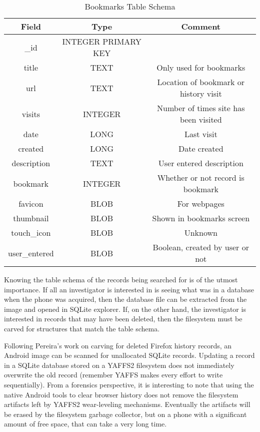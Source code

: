 \begin{table}
\begin {center}
	\begin{tabular}{| c | c | c |}
	\hline
	Field & Type & Comment \\
	\hline
	\_id & INTEGER PRIMARY KEY & \\
	title & TEXT  &  Only used for bookmarks \\
	url & TEXT  & Location of bookmark or history visit \\
	visits & INTEGER  & Number of times site has been visited \\
	date & LONG  &  Last visit \\
	created & LONG &  Date created \\
	description & TEXT &  User entered description \\
	bookmark & INTEGER & Whether or not record is bookmark \\
	favicon & BLOB &  For webpages \\
	thumbnail & BLOB &  Shown in bookmarks screen \\
	touch\_icon & BLOB &  Unknown \\
	user\_entered & BLOB & Boolean, created by user or not \\
	\hline
	\end{tabular}
\end{center}
	\caption{Bookmarks Table Schema}
	\label{tab:bookmarkschema}
\end{table}

Knowing the table schema of the records being searched for is of the utmost importance.  If all an investigator is interested in is
seeing what was in a database when the phone was acquired, then the database file can be extracted from the image and opened in
SQLite explorer.  If, on the other hand, the investigator is interested in records that may have been deleted, then the filesystem
must be carved for structures that match the table schema.

Following Pereira's work on carving for deleted Firefox history records, an Android image can be scanned for unallocated SQLite
records.  Updating a record in a SQLite database stored on a YAFFS2 filesystem does not immediately overwrite the old record
(remember YAFFS makes every effort to write sequentially).  From a forensics perspective, it is interesting to note that using the
native Android tools to clear browser history does not remove the filesystem artifacts left by YAFFS2 wear-leveling mechanisms.
Eventually the artifacts will be erased by the filesystem garbage collector, but on a phone with a significant amount of free space,
that can take a very long time.

